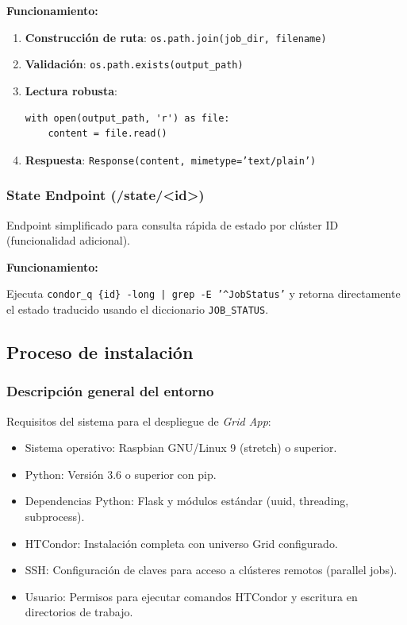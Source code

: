 \textbf{Funcionamiento:}

\begin{enumerate}
	\item \textbf{Construcción de ruta}: \texttt{os.path.join(job\_dir, filename)}

	\item \textbf{Validación}: \texttt{os.path.exists(output\_path)}

	\item \textbf{Lectura robusta}: 
	      \begin{verbatim}
with open(output_path, 'r') as file:
    content = file.read()
	      \end{verbatim}

	\item \textbf{Respuesta}: \texttt{Response(content, mimetype='text/plain')}
\end{enumerate}

\subsubsection{State Endpoint (/state/<id>)}
\noindent

Endpoint simplificado para consulta rápida de estado por clúster ID (funcionalidad adicional).

\textbf{Funcionamiento:}

Ejecuta \texttt{condor\_q \{id\} -long | grep -E '\^{}JobStatus'} y retorna directamente el estado traducido usando el diccionario \texttt{JOB\_STATUS}.

\subsection{Proceso de instalación}
\noindent

\subsubsection{Descripción general del entorno}
\noindent
Requisitos del sistema para el despliegue de \textit{Grid App}:

\begin{itemize}
	\item Sistema operativo: Raspbian GNU/Linux 9 (stretch) o superior.
	\item Python: Versión 3.6 o superior con pip.
	\item Dependencias Python: Flask y módulos estándar (uuid, threading, subprocess).
	\item HTCondor: Instalación completa con universo Grid configurado.
	\item SSH: Configuración de claves para acceso a clústeres remotos (parallel jobs).
	\item Usuario: Permisos para ejecutar comandos HTCondor y escritura en directorios de trabajo.
\end{itemize}

